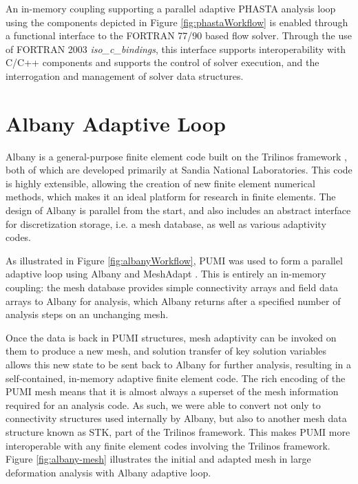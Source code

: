 An in-memory coupling supporting a parallel adaptive PHASTA analysis
loop \cite{smith2016building} using the components depicted in
Figure \ref{fig:phastaWorkflow} is enabled through a functional interface to the
FORTRAN 77/90 based flow solver. Through the use of FORTRAN 2003
\emph{iso\_c\_bindings}, this interface supports interoperability with C/C++
components and supports the control of solver execution, and the interrogation
and management of solver data structures.

\section{Albany Adaptive Loop}
\label{sec:albany}

Albany is a general-purpose finite element code built on the
Trilinos framework \cite{TrilinosOverview,trilinosweb}, both of which are developed
primarily at Sandia National Laboratories. This code is highly extensible,
allowing the creation of new finite element numerical methods, which makes it an
ideal platform for research in finite elements. The design of Albany is parallel
from the start, and also includes an abstract interface for discretization
storage, i.e. a mesh database, as well as various adaptivity codes.

As illustrated in Figure \ref{fig:albanyWorkflow}, PUMI was used to form a
parallel adaptive loop using Albany and MeshAdapt \cite{smith2016building,meshadaptweb}.
This is entirely an in-memory coupling: the mesh database provides simple
connectivity arrays and field data arrays to Albany for analysis, which Albany
returns after a specified number of analysis steps on an unchanging mesh.

Once the data is back in PUMI structures, mesh adaptivity can be invoked on them
to produce a new mesh, and solution transfer of key solution variables allows
this new state to be sent back to Albany for further analysis,
resulting in a self-contained, in-memory adaptive finite element code. The rich
encoding of the PUMI mesh means that it is almost always a superset of the mesh
information required for an analysis code. As such, we were able to convert not
only to connectivity structures used internally by Albany, but also to another
mesh data structure known as STK, part of the Trilinos framework. This makes
PUMI more interoperable with any finite element codes involving the Trilinos
framework. Figure \ref{fig:albany-mesh} illustrates the initial and adapted mesh
in large deformation analysis with Albany adaptive loop.

